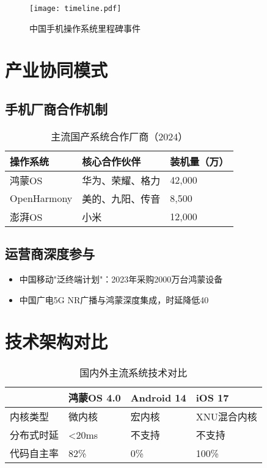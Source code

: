 \documentclass[12pt,hyperref,a4paper,UTF8]{ctexart}
\begin{document}
\begin{figure}[htbp]
    \centering
    \texttt{[image: timeline.pdf]}
    \caption{中国手机操作系统里程碑事件}
    \label{fig:timeline}
\end{figure}

\section{产业协同模式}
\subsection{手机厂商合作机制}
\begin{table}[htbp]
    \centering
    \caption{主流国产系统合作厂商（2024）}
    \begin{tabular}{lll}
    \toprule
    操作系统 & 核心合作伙伴 & 装机量（万） \\
    \midrule
    鸿蒙OS & 华为、荣耀、格力 & 42,000 \\
    OpenHarmony & 美的、九阳、传音 & 8,500 \\
    澎湃OS & 小米 & 12,000 \\
    \bottomrule
    \end{tabular}
\end{table}

\subsection{运营商深度参与}
\begin{itemize}
    \item 中国移动"泛终端计划"：2023年采购2000万台鸿蒙设备
    \item 中国广电5G NR广播与鸿蒙深度集成，时延降低40%
\end{itemize}

\section{技术架构对比}
\begin{table}[htbp]
    \centering
    \caption{国内外主流系统技术对比}
    \begin{tabular}{llll}
    \toprule
     & 鸿蒙OS 4.0 & Android 14 & iOS 17 \\
    \midrule
    内核类型 & 微内核 & 宏内核 & XNU混合内核 \\
    分布式时延 & <20ms & 不支持 & 不支持 \\
    代码自主率 & 82\% & 0\% & 100\% \\
    \bottomrule
    \end{tabular}
\end{table}
\end{document}
